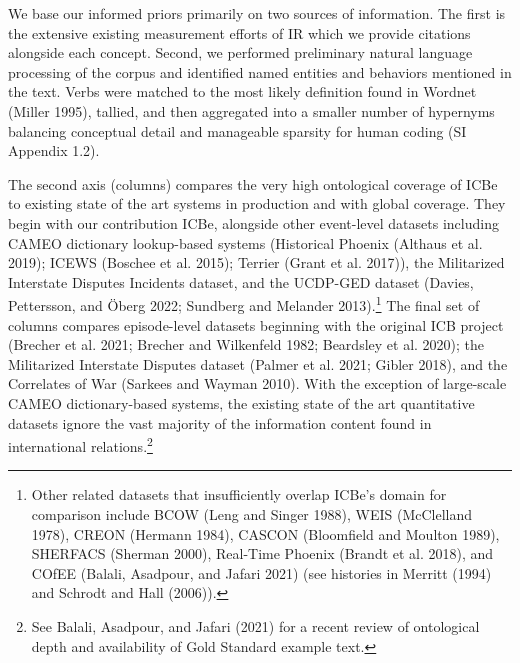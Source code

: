 \documentclass{article}
\renewcommand{\arraystretch}{0.8}
\begin{document}
We base our informed priors primarily on two sources of information. The
first is the extensive existing measurement efforts of IR which we
provide citations alongside each concept. Second, we performed
preliminary natural language processing of the corpus and identified
named entities and behaviors mentioned in the text. Verbs were matched
to the most likely definition found in Wordnet (Miller 1995), tallied,
and then aggregated into a smaller number of hypernyms balancing
conceptual detail and manageable sparsity for human coding (SI Appendix
1.2).

The second axis (columns) compares the very high ontological coverage of
ICBe to existing state of the art systems in production and with global
coverage. They begin with our contribution ICBe, alongside other
event-level datasets including CAMEO dictionary lookup-based systems
(Historical Phoenix (Althaus et al. 2019); ICEWS (Boschee et al. 2015);
Terrier (Grant et al. 2017)), the Militarized Interstate Disputes
Incidents dataset, and the UCDP-GED dataset (Davies, Pettersson, and
Öberg 2022; Sundberg and Melander 2013).\footnote{Other related datasets
  that insufficiently overlap ICBe's domain for comparison include BCOW
  (Leng and Singer 1988), WEIS (McClelland 1978), CREON (Hermann 1984),
  CASCON (Bloomfield and Moulton 1989), SHERFACS (Sherman 2000),
  Real-Time Phoenix (Brandt et al. 2018), and COfEE (Balali, Asadpour,
  and Jafari 2021) (see histories in Merritt (1994) and Schrodt and Hall
  (2006)).} The final set of columns compares episode-level datasets
beginning with the original ICB project (Brecher et al. 2021; Brecher
and Wilkenfeld 1982; Beardsley et al. 2020); the Militarized Interstate
Disputes dataset (Palmer et al. 2021; Gibler 2018), and the Correlates
of War (Sarkees and Wayman 2010). With the exception of large-scale
CAMEO dictionary-based systems, the existing state of the art
quantitative datasets ignore the vast majority of the information
content found in international relations.\footnote{See Balali, Asadpour,
  and Jafari (2021) for a recent review of ontological depth and
  availability of Gold Standard example text.}

\clearpage

\providecommand{\docline}[3]{\noalign{\global\setlength{\arrayrulewidth}{#1}}\arrayrulecolor[HTML]{#2}\cline{#3}}

\setlength{\tabcolsep}{2pt}

\renewcommand*{\arraystretch}{0.75}
\end{document}
